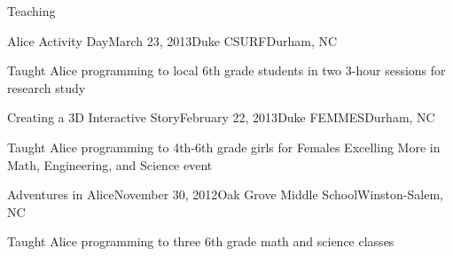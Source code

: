 \documentclass{resume} %
\begin{document}
\begin{rSection}{Teaching}

\begin{rSubsection}{Alice Activity Day}{March 23, 2013}{Duke CSURF}{Durham, NC}
\item Taught Alice programming to local 6th grade students in two 3-hour sessions for research study
\end{rSubsection}



\begin{rSubsection}{Creating a 3D Interactive Story}{February 22, 2013}{Duke FEMMES}{Durham, NC}
\item Taught Alice programming to 4th-6th grade girls for Females Excelling More in Math, Engineering, and Science event
\end{rSubsection}



\begin{rSubsection}{Adventures in Alice}{November 30, 2012}{Oak Grove Middle School}{Winston-Salem, NC}
\item Taught Alice programming to three 6th grade math and science classes
\end{rSubsection}

\end{rSection}


\end{document}
